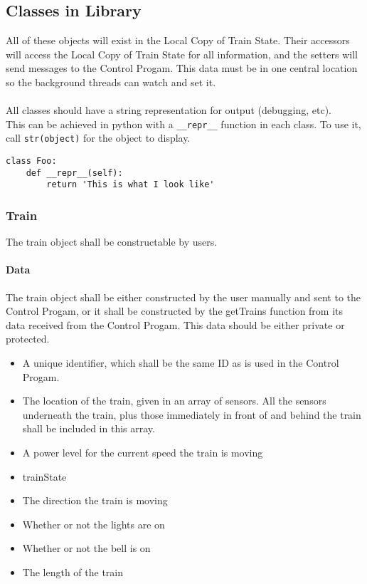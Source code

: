 \documentclass[a4paper,11pt,notitlepage]{article}
\def\CS{Control Progam\xspace}
\def\LC{Local Copy of Train State\xspace}
\begin{document}
\subsection{Classes in Library}
All of these objects will exist in the \LC. Their accessors will access the \LC for all information, and the setters will send messages to the \CS. This data must be in one central location so the background threads can watch and set it. \\ \\
All classes should have a string representation for output (debugging, etc).\\
This can be achieved in python with a \verb!__repr__! function in each class. To use it, call \verb!str(object)! for the object to display.
\begin{verbatim}
class Foo:
    def __repr__(self):
        return 'This is what I look like'
\end{verbatim}

\subsubsection{Train}
The train object shall be constructable by users.
\paragraph{Data}
The train object shall be either constructed by the user manually and sent to the \CS, or it shall be constructed by the getTrains function from its data received from the \CS. This data should be either private or protected.
\begin{itemize}
\item A unique identifier, which shall be the same ID as is used in the \CS.
\item The location of the train, given in an array of sensors. All the sensors underneath the train, plus those immediately in front of and behind the train shall be included in this array.
\item A power level for the current speed the train is moving
\item trainState
\item The direction the train is moving
\item Whether or not the lights are on
\item Whether or not the bell is on
\item The length of the train
\end{itemize}
\end{document}
